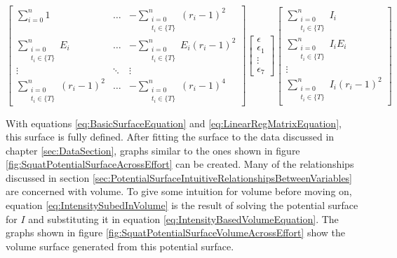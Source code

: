 \begin{equation}
    \label{eq:LinearRegMatrixEquation}
	\left[
    \begin{matrix}
        \sum_{i=0}^n 1 &
        \dots &
        -\sum_{\substack{i=0\\ t_i\in \{ T \}}}^n (r_i-1)^2 \\

        \sum_{\substack{i=0\\ t_i\in \{ T \}}}^n  E_i &
        \dots &
        -\sum_{\substack{i=0\\ t_i\in \{ T \}}}^n E_i (r_i-1)^2\\

        \vdots &
        \ddots &
        \vdots \\
        
        \sum_{\substack{i=0\\ t_i\in \{ T \}}}^n (r_i-1)^2 &
        \dots &
        -\sum_{\substack{i=0\\ t_i\in \{ T \}}}^n (r_i-1)^4
    \end{matrix}
    \right]
	\left[
    \begin{matrix}
        \epsilon \\ \epsilon_1 \\ \vdots \\ \epsilon_7
    \end{matrix}
    \right]
	\left[
    \begin{matrix}
        \sum_{\substack{i=0\\ t_i\in \{ T \}}}^n I_i \\
        \sum_{\substack{i=0\\ t_i\in \{ T \}}}^n I_i E_i \\
        \vdots \\
        \sum_{\substack{i=0\\ t_i\in \{ T \}}}^n I_i(r_i-1)^2 
    \end{matrix}
    \right]
\end{equation}

With equations \ref{eq:BasicSurfaceEquation} and \ref{eq:LinearRegMatrixEquation}, this surface is fully defined. After fitting the surface to the data discussed in chapter \ref{sec:DataSection}, graphs similar to the ones shown in figure \ref{fig:SquatPotentialSurfaceAcrossEffort} can be created. Many of the relationships discussed in section \ref{sec:PotentialSurfaceIntuitiveRelationshipsBetweenVariables} are concerned with volume. To give some intuition for volume before moving on, equation \ref{eq:IntensitySubedInVolume} is the result of solving the potential surface for $I$ and substituting it in equation \ref{eq:IntensityBasedVolumeEquation}. The graphs shown in figure \ref{fig:SquatPotentialSurfaceVolumeAcrossEffort} show the volume surface generated from this potential surface.

